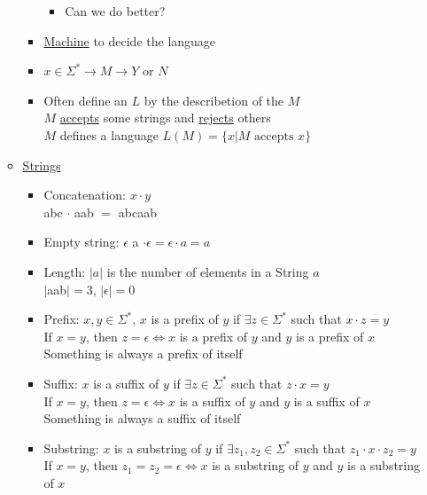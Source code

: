 \documentclass[12pt]{article}
\begin{document}
\begin{enumerate}
\begin{itemize}
\begin{itemize}
\begin{itemize}
                    \item Can we do better?
                \end{itemize}
                \item \underline{Machine} to decide the language
                \item $x \in \Sigma^* \rightarrow \boxed{M} \rightarrow Y$ or $N$
                \item Often define an $L$ by the describetion of the $M$ \\
                $M$ \underline{accepts} some strings and \underline{rejects} others \\
                $M$ defines a language $L(M) = \{x|M \text{ accepts } x\}$
            \end{itemize}
            \item \underline{Strings}
            \begin{itemize}
                \item Concatenation: $x \cdot y$ \\
                abc $\cdot$ aab $= $ abcaab
                \item Empty string: $\epsilon$
                a $\cdot \epsilon = \epsilon \cdot a = a$
                \item Length: $|a|$ is the number of elements in a String $a$ \\
                $|$aab$| = 3$, $|\epsilon| = 0$
                \item Prefix: $x, y \in \Sigma^*$, $x$ is a prefix of $y$ if $\exists z \in \Sigma^*$ such that $x \cdot z = y$ \\
                If $x = y$, then $z = \epsilon \iff x$ is a prefix of $y$ and $y$ is a prefix of $x$ \\
                Something is always a prefix of itself
                \item Suffix: $x$ is a suffix of $y$ if $\exists z \in \Sigma^*$ such that $z \cdot x = y$ \\
                If $x = y$, then $z = \epsilon \iff x$ is a suffix of $y$ and $y$ is a suffix of $x$ \\
                Something is always a suffix of itself
                \item Substring: $x$ is a substring of $y$ if $\exists z_1, z_2 \in \Sigma^*$ such that $z_1 \cdot x \cdot z_2 = y$ \\
                If $x = y$, then $z_1 = z_2 = \epsilon \iff x$ is a substring of $y$ and $y$ is a substring of $x$

\end{itemize}
\end{itemize}
\end{enumerate}
\end{document}
